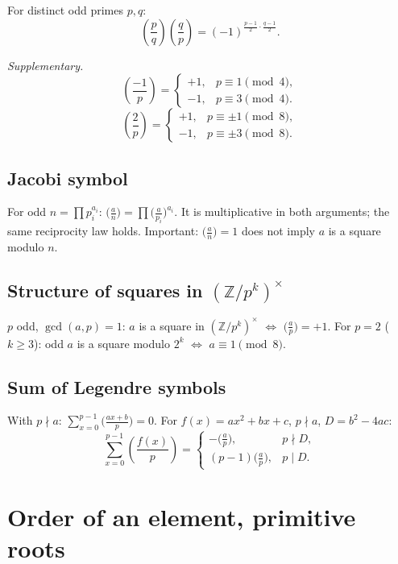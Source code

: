 For distinct odd primes $p,q$:
$$\left(\frac{p}{q}\right)\left(\frac{q}{p}\right)=(-1)^{\frac{p-1}{2}\cdot\frac{q-1}{2}}.$$

\textit{Supplementary.}
$$\left(\frac{-1}{p}\right)=\begin{cases}+1,&p\equiv1\pmod4,\\-1,&p\equiv3\pmod4.\end{cases}$$
$$\left(\frac{2}{p}\right)=\begin{cases}+1,&p\equiv\pm1\pmod8,\\-1,&p\equiv\pm3\pmod8.\end{cases}$$

\subsection{Jacobi symbol}
\label{subsec:jacobi}

For odd $n=\prod p_i^{a_i}$: $\bigl(\frac{a}{n}\bigr)=\prod\bigl(\frac{a}{p_i}\bigr)^{a_i}$. It is multiplicative in both arguments; the same reciprocity law holds. Important: $\bigl(\frac{a}{n}\bigr)=1$ does not imply $a$ is a square modulo $n$.

\subsection{Structure of squares in $(\mathbb{Z}/p^k)^\times$}
\label{subsec:squares-mod-pk}

$p$ odd, $\gcd(a,p)=1$: $a$ is a square in $(\mathbb{Z}/p^k)^\times$ $\iff$ $\bigl(\frac{a}{p}\bigr)=+1$.
For $p=2$ ($k\ge3$): odd $a$ is a square modulo $2^k$ $\iff$ $a\equiv1\pmod8$.

\subsection{Sum of Legendre symbols}
\label{subsec:sum-legendre}

With $p\nmid a$: $\sum_{x=0}^{p-1}\bigl(\frac{ax+b}{p}\bigr)=0$.
For $f(x)=ax^2+bx+c$, $p\nmid a$, $D=b^2-4ac$:
$$\sum_{x=0}^{p-1}\left(\frac{f(x)}{p}\right)=\begin{cases}
-\bigl(\frac{a}{p}\bigr), & p\nmid D,\\
(p-1)\bigl(\frac{a}{p}\bigr), & p\mid D.
\end{cases}$$

\medskip

\section{Order of an element, primitive roots}
\label{sec:primitive-roots}

